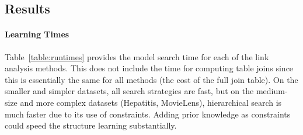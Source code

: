 \documentclass{article}
\begin{document}
%
%


\subsection{Results} 

\paragraph{Learning Times} Table~\ref{table:runtimes}
 provides the model search time for each of the link analysis methods. 
This does not include the time for computing table joins since this is essentially the same for all methods (the cost of the full join table). 
On the smaller and simpler datasets, all search strategies are fast, 
but on the medium-size and more complex datasets (Hepatitis, MovieLens), hierarchical search is much faster due to its use of constraints.
Adding prior knowledge as constraints could speed the structure learning substantially.

\end{document}
